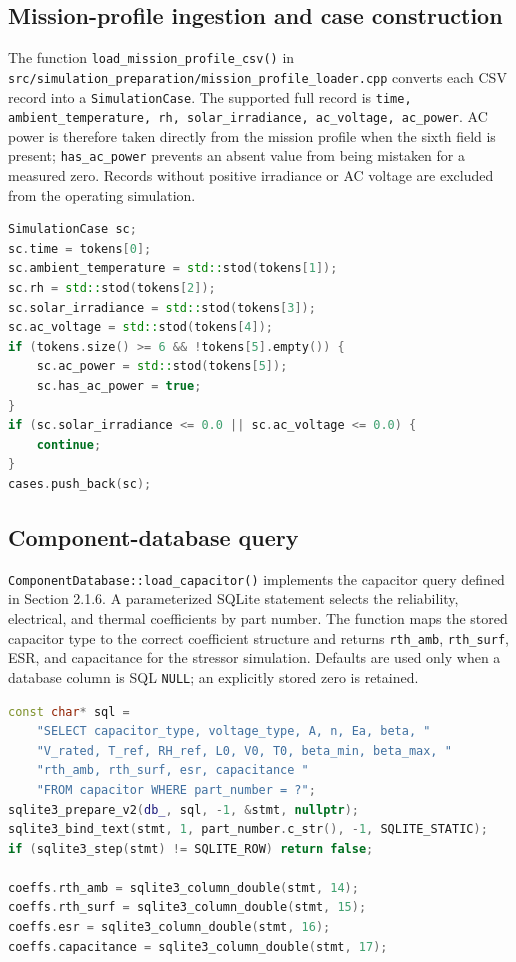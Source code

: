 \documentclass{article}
\begin{document}
\subsection{Mission-profile ingestion and case construction}
\label{sec:implementation-mission}
The function \texttt{load\_mission\_profile\_csv()} in
\texttt{src/simulation\_preparation/mission\_profile\_loader.cpp} converts each
CSV record into a \texttt{SimulationCase}.  The supported full record is
\texttt{time, ambient\_temperature, rh, solar\_irradiance, ac\_voltage,
ac\_power}.  AC power is therefore taken directly from the mission profile when
the sixth field is present; \texttt{has\_ac\_power} prevents an absent value from
being mistaken for a measured zero.  Records without positive irradiance or AC
voltage are excluded from the operating simulation.

\begin{lstlisting}[language=C++,caption={Mission-profile row parsing and operating-point filtering}]
SimulationCase sc;
sc.time = tokens[0];
sc.ambient_temperature = std::stod(tokens[1]);
sc.rh = std::stod(tokens[2]);
sc.solar_irradiance = std::stod(tokens[3]);
sc.ac_voltage = std::stod(tokens[4]);
if (tokens.size() >= 6 && !tokens[5].empty()) {
    sc.ac_power = std::stod(tokens[5]);
    sc.has_ac_power = true;
}
if (sc.solar_irradiance <= 0.0 || sc.ac_voltage <= 0.0) {
    continue;
}
cases.push_back(sc);
\end{lstlisting}

\subsection{Component-database query}
\label{sec:implementation-database}
\texttt{ComponentDatabase::load\_capacitor()} implements the capacitor query
defined in Section 2.1.6.  A parameterized SQLite statement selects the
reliability, electrical, and thermal coefficients by part number.  The function
maps the stored capacitor type to the correct coefficient structure and returns
\texttt{rth\_amb}, \texttt{rth\_surf}, ESR, and capacitance for the stressor
simulation.  Defaults are used only when a database column is SQL \texttt{NULL};
an explicitly stored zero is retained.

\begin{lstlisting}[language=C++,caption={Capacitor coefficient lookup by part number}]
const char* sql =
    "SELECT capacitor_type, voltage_type, A, n, Ea, beta, "
    "V_rated, T_ref, RH_ref, L0, V0, T0, beta_min, beta_max, "
    "rth_amb, rth_surf, esr, capacitance "
    "FROM capacitor WHERE part_number = ?";
sqlite3_prepare_v2(db_, sql, -1, &stmt, nullptr);
sqlite3_bind_text(stmt, 1, part_number.c_str(), -1, SQLITE_STATIC);
if (sqlite3_step(stmt) != SQLITE_ROW) return false;

coeffs.rth_amb = sqlite3_column_double(stmt, 14);
coeffs.rth_surf = sqlite3_column_double(stmt, 15);
coeffs.esr = sqlite3_column_double(stmt, 16);
coeffs.capacitance = sqlite3_column_double(stmt, 17);
\end{lstlisting}
\end{document}

